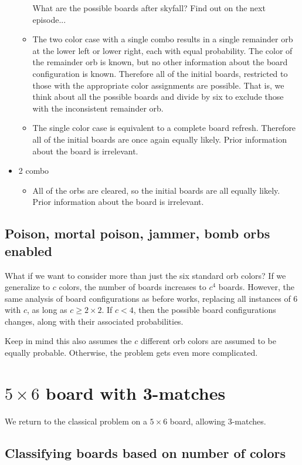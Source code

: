 \documentclass[12pt]{article}
\theoremstyle{definition}
\begin{document}
\begin{itemize}
\begin{itemize}
        What are the possible boards after skyfall? Find out on the next episode...
        \item 
        The two color case with a single combo results in a single remainder orb at the lower left or lower right, each with equal probability. The color of the remainder orb is known, but no other information about the board configuration is known. Therefore all of the initial boards, restricted to those with the appropriate color assignments are possible. That is, we think about all the possible boards and divide by six to exclude those with the inconsistent remainder orb.
        \item The single color case is equivalent to a complete board refresh. Therefore all of the initial boards are once again equally likely. Prior information about the board is irrelevant.
    \end{itemize}
    \item 2 combo
    \begin{itemize}
        \item All of the orbs are cleared, so the initial boards are all equally likely. Prior information about the board is irrelevant.
    \end{itemize}
\end{itemize}
\subsection{Poison, mortal poison, jammer, bomb orbs enabled}
What if we want to consider more than just the six standard orb colors? If we generalize to $c$ colors, the number of boards increases to $c^4$ boards. However, the same analysis of board configurations as before works, replacing all instances of 6 with $c$, as long as $c\geq 2\times 2$. If $c<4$, then the possible board configurations changes, along with their associated probabilities.

Keep in mind this also assumes the $c$ different orb colors are assumed to be equally probable. Otherwise, the problem gets even more complicated.


\section{$5\times 6$ board with 3-matches}
We return to the classical problem on a $5\times 6$ board, allowing 3-matches.

\subsection{Classifying boards based on number of colors}
\end{document}
